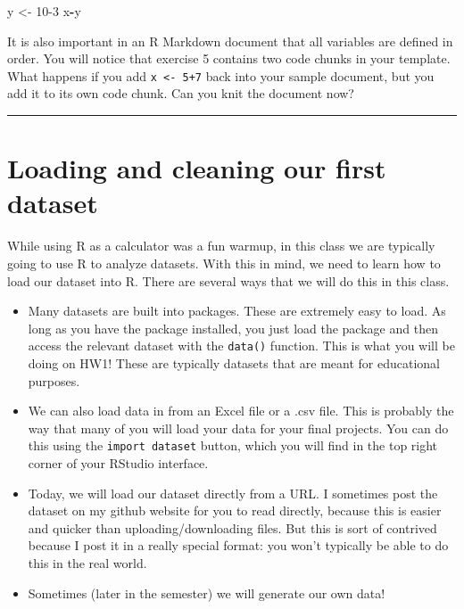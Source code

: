 \documentclass[
]{article}
\newenvironment{Shaded}{\begin{snugshade}}{\end{snugshade}}
\newcommand{\DecValTok}[1]{\textcolor[rgb]{0.00,0.00,0.81}{#1}}
\newcommand{\NormalTok}[1]{#1}
\newcommand{\OtherTok}[1]{\textcolor[rgb]{0.56,0.35,0.01}{#1}}
\newcommand{\SpecialCharTok}[1]{\textcolor[rgb]{0.81,0.36,0.00}{\textbf{#1}}}
\providecommand{\tightlist}{%
  \setlength{\itemsep}{0pt}\setlength{\parskip}{0pt}}
\begin{document}
\begin{Shaded}
\begin{Highlighting}[]
\NormalTok{y }\OtherTok{\textless{}{-}} \DecValTok{10{-}3}
\NormalTok{x}\SpecialCharTok{{-}}\NormalTok{y}
\end{Highlighting}
\end{Shaded}

It is also important in an R Markdown document that all variables are
defined in order. You will notice that exercise 5 contains two code
chunks in your template. What happens if you add
\texttt{x\ \textless{}-\ 5+7} back into your sample document, but you
add it to its own code chunk. Can you knit the document now?

\begin{center}\rule{0.5\linewidth}{0.5pt}\end{center}

\section{Loading and cleaning our first
dataset}\label{loading-and-cleaning-our-first-dataset}

While using R as a calculator was a fun warmup, in this class we are
typically going to use R to analyze datasets. With this in mind, we need
to learn how to load our dataset into R. There are several ways that we
will do this in this class.

\begin{itemize}
\tightlist
\item
  Many datasets are built into packages. These are extremely easy to
  load. As long as you have the package installed, you just load the
  package and then access the relevant dataset with the \texttt{data()}
  function. This is what you will be doing on HW1! These are typically
  datasets that are meant for educational purposes.
\item
  We can also load data in from an Excel file or a .csv file. This is
  probably the way that many of you will load your data for your final
  projects. You can do this using the \texttt{import\ dataset} button,
  which you will find in the top right corner of your RStudio interface.
\item
  Today, we will load our dataset directly from a URL. I sometimes post
  the dataset on my github website for you to read directly, because
  this is easier and quicker than uploading/downloading files. But this
  is sort of contrived because I post it in a really special format: you
  won't typically be able to do this in the real world.
\item
  Sometimes (later in the semester) we will generate our own data!
\end{itemize}
\end{document}
